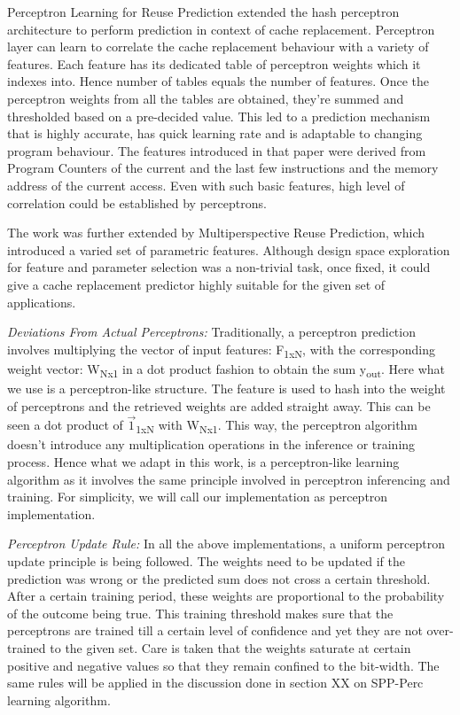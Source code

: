 Perceptron Learning for Reuse Prediction\cite{Perc_Reuse} extended the
hash perceptron architecture to perform prediction in context of cache
replacement.  Perceptron layer can learn to correlate the cache
replacement behaviour with a variety of features.  Each feature has
its dedicated table of perceptron weights which it indexes into.
Hence number of tables equals the number of features.  Once the
perceptron weights from all the tables are obtained, they're summed
and thresholded based on a pre-decided value.  This led to a
prediction mechanism that is highly accurate, has quick learning rate
and is adaptable to changing program behaviour.  The features
introduced in that paper were derived from Program Counters of the
current and the last few instructions and the memory address of the
current access.  Even with such basic features, high level of
correlation could be established by perceptrons.

The work was further extended by Multiperspective Reuse
Prediction\cite{Multiperspective}, which introduced a varied set of
parametric features.  Although design space exploration for feature
and parameter selection was a non-trivial task, once fixed, it could
give a cache replacement predictor highly suitable for the given set
of applications.

\textit{Deviations From Actual Perceptrons:} Traditionally, a
perceptron prediction involves multiplying the vector of input
features: F\textsubscript{1xN}, with the corresponding weight vector:
W\textsubscript{Nx1} in a dot product fashion to obtain the sum
y\textsubscript{out}.  Here what we use is a perceptron-like
structure.  The feature is used to hash into the weight of perceptrons
and the retrieved weights are added straight away.  This can be seen a
dot product of $\vec{1}$\textsubscript{1xN} with W\textsubscript{Nx1}.
This way, the perceptron algorithm doesn't introduce any
multiplication operations in the inference or training process.  Hence
what we adapt in this work, is a perceptron-like learning algorithm as
it involves the same principle involved in perceptron inferencing and
training.  For simplicity, we will call our implementation as
perceptron implementation.

\textit{Perceptron Update Rule:} In all the above implementations, a
uniform perceptron update principle is being followed.  The weights
need to be updated if the prediction was wrong or the predicted sum
does not cross a certain threshold.  After a certain training period,
these weights are proportional to the probability of the outcome being
true.  This training threshold makes sure that the perceptrons are
trained till a certain level of confidence and yet they are not
over-trained to the given set.  Care is taken that the weights
saturate at certain positive and negative values so that they remain
confined to the bit-width.  The same rules will be applied in the
discussion done in section XX on SPP-Perc learning algorithm.

